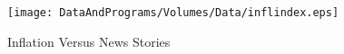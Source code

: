 \begin{figure}
 \centerline{\texttt{[image: DataAndPrograms/Volumes/Data/inflindex.eps]}}%
 \caption{Inflation Versus News Stories}
 \label{fig:inflfigs}
\end{figure}
